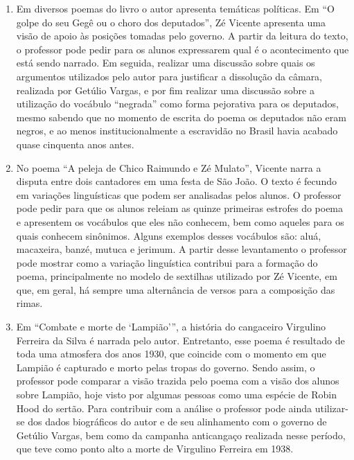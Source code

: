 \begin{enumerate}
\item Em diversos poemas do livro o autor apresenta temáticas políticas.
Em ``O golpe do seu Gegê ou o choro dos
deputados'', Zé Vicente apresenta uma visão de apoio às
posições tomadas pelo governo. A partir da leitura do texto, o
professor pode pedir para os alunos expressarem qual é o acontecimento
que está sendo narrado. Em seguida, realizar uma discussão sobre quais os
argumentos utilizados pelo autor para justificar a dissolução da
câmara, realizada por Getúlio Vargas, e por fim realizar uma discussão
sobre a utilização do vocábulo ``negrada'' como forma pejorativa
para os deputados, mesmo sabendo que no momento de escrita do poema os
deputados não eram negros, e ao menos institucionalmente a
escravidão no Brasil havia acabado quase cinquenta anos antes.


\item No poema ``A peleja de Chico Raimundo e Zé
Mulato'', Vicente narra a disputa entre dois
cantadores em uma festa de São João. O texto é fecundo em variações
linguísticas que podem ser analisadas pelos alunos. O professor pode
pedir para que os alunos releiam as quinze primeiras estrofes do poema e
apresentem os vocábulos que eles não conhecem, bem como aqueles para 
os quais conhecem sinônimos. Alguns exemplos
desses vocábulos são: aluá, macaxeira, banzé, mutuca e jerimum. A
partir desse levantamento o professor pode mostrar como a variação
linguística contribui para a formação do poema, principalmente no
modelo de sextilhas utilizado por Zé Vicente, em que, em geral, há
sempre uma alternância de versos para a composição das rimas.


\item Em ``Combate e morte de
`Lampião''', a história do cangaceiro Virgulino Ferreira da Silva é narrada pelo
autor. Entretanto, esse poema é resultado de toda uma atmosfera dos anos
1930, que coincide com o momento em que Lampião é capturado e morto
pelas tropas do governo. Sendo assim, o professor pode comparar a visão
trazida pelo poema com a visão dos alunos sobre Lampião, hoje visto
por algumas pessoas como uma espécie de Robin Hood do sertão. Para
contribuir com a análise o professor pode ainda utilizar-se dos dados
biográficos do autor e de seu alinhamento com o governo de Getúlio
Vargas, bem como da campanha anticangaço realizada nesse período, que
teve como ponto alto a morte de Virgulino Ferreira em 1938. 



\end{enumerate}
